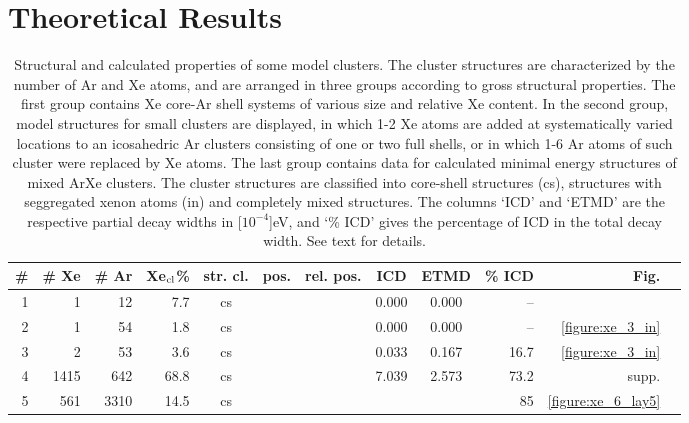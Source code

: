 \section{Theoretical Results
\label{sec:th_results}}
%
%
\begin{table}[H]
\small
\centering
\caption{Structural and calculated properties of some model clusters.
The cluster structures are characterized by the number of Ar and Xe atoms,
and are arranged in three groups according to gross structural properties. 
The first group contains Xe core-Ar shell systems of various
size and relative Xe content.
In the second group, model structures for small clusters are displayed,
in which 1-2 Xe atoms are added at systematically varied locations
to an icosahedric Ar clusters consisting of one or two full shells,
or in which 1-6 Ar atoms of such cluster were replaced by Xe atoms.
The last group contains data for calculated minimal energy structures
of mixed ArXe clusters.\protect\cite{marques}
The cluster structures are classified into core-shell structures (cs),
structures with seggregated xenon atoms (in) and completely mixed
structures.
The columns `ICD' and `ETMD' are the respective partial decay widths
in \unit[$10^{-4}$]{eV}, and `\% ICD' gives the percentage of ICD in
the total decay width.
See text for details.
\label{table:theo_gammas}
}
\begin{tabular}{rrrrcccccrrr}
\toprule
\# & \# Xe & \# Ar & Xe$_{\rm cl}$\% & str. cl. & pos. & rel. pos. & ICD   &  ETMD & \% ICD & Fig.\\ %
\midrule
 1 &     1 &    12 &  7.7  & cs    &         &          & 0.000 & 0.000 &  -- &\\ %
 2 &     1 &    54 &  1.8  & cs    &         &          & 0.000 & 0.000 &  -- & \ref{figure:xe_3_in}\\ %
 3 &     2 &    53 &  3.6  & cs    &         &          & 0.033 & 0.167 &  16.7& \ref{figure:xe_3_in}\\ %
 4 &  1415 &   642 & 68.8  & cs    &         &          & 7.039 & 2.573 &  73.2& supp.\\ %
 5 &   561 &  3310 & 14.5  & cs    &         &          &       &       &  85  & \ref{figure:xe_6_lay5}\\ %
 

\end{tabular}
\end{table}
